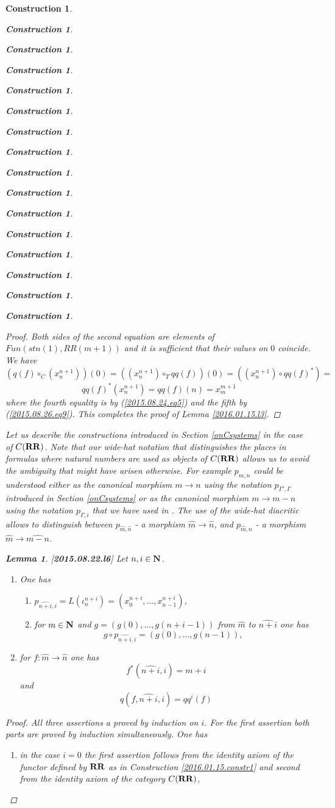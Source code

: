 \documentclass[12pt]{amsart}
\newtheorem{lemma}[proposition]{Lemma}
\newtheorem{construction}[proposition]{Construction}
\newcommand{\llabel}[1]{\label{#1}[{\bf #1}]}
\newcommand{\sr}{\rightarrow}
\newcommand{\nn}{{\bf N\rm}}
\newcommand{\nat}{\nn}
\newcommand{\wh}{\widehat}
\newcommand{\mbind}[1]{{#1^*}}
\newcommand{\RR}{{\bf RR}}
\begin{document}
\begin{construction}
\begin{construction}
\begin{construction}
\begin{construction}
\begin{construction}
\begin{construction}
\begin{construction}
\begin{construction}
\begin{construction}
\begin{construction}
\begin{construction}
\begin{construction}
\begin{construction}
\begin{construction}
\begin{construction}
\begin{construction}
\begin{proof}
Both sides of the second equation are elements of $Fun(stn(1),RR(m+1))$ and it is sufficient that their values on $0$ coincide. We have 
%
$$(q(f)\circ_C (x_n^{n+1}))(0)=((x_n^{n+1})\circ_T qq(f))(0)=((x_n^{n+1})\circ \mbind{qq(f)})=$$$$\mbind{qq(f)}(x_n^{n+1})=qq(f)(n)=x_m^{m+1}$$
%
where the fourth equality is by (\ref{2015.08.24.eq5}) and the fifth by (\ref{2015.08.26.eq9}). This completes the proof of Lemma \ref{2016.01.15.l3}.
\end{proof}

%
Let us describe the constructions introduced in Section \ref{onCsystems} in the case of $C(\RR)$. Note that our wide-hat notation that distinguishes the places in formulas where natural numbers are used as objects of $C(\RR)$ allows us to avoid the ambiguity that might have arisen otherwise. For example $p_{m,n}$ could be understood either as the canonical morphism $m\sr n$ using the notation $p_{\Gamma',\Gamma}$ introduced in Section \ref{onCsystems} or as the canonical morphism $m\sr m-n$ using the notation $p_{\Gamma,i}$ that we have used in \cite{Csubsystems}.  The use of the wide-hat diacritic allows to distinguish between $p_{\wh{m},\wh{n}}$ - a morphism $\wh{m}\sr \wh{n}$,  and $p_{\wh{m},n}$ - a morphism $\wh{m}\sr \wh{m-n}$. 
%
\begin{lemma}
\llabel{2015.08.22.l6}
Let $n,i\in\nat$. 
%
\begin{enumerate}
\item One has
%
\begin{enumerate}
\item $p_{\wh{n+i},i}=L(\iota^{n+i}_{n})=(x_0^{n+i},\dots,x_{n-1}^{n+i})$,
\item for $m\in\nat$ and $g=(g(0),\dots,g(n+i-1))$ from $\wh{m}$ to $\wh{n+i}$ one has 
%
$$g\circ p_{\wh{n+i},i}=(g(0),\dots,g(n-1)),$$
%
\end{enumerate}
%
\item for $f:\wh{m}\sr \wh{n}$ one has
%
$$f^*(\wh{n+i},i)=m+i$$
%
and
%
$$q(f,\wh{n+i},i)=qq^i(f)$$
%
\end{enumerate}
\end{lemma}
%
\begin{proof}
All three assertions a proved by induction on $i$. For the first assertion both parts are proved by induction simultaneously. One has
%
\begin{enumerate}
\item in the case $i=0$ the first assertion follows from the identity axiom of the functor defined by $\RR$ as in Construction \ref{2016.01.15.constr1} and second from the identity axiom of the category $C(\RR)$,

\end{enumerate}
\end{proof}
\end{construction}
\end{construction}
\end{construction}
\end{construction}
\end{construction}
\end{construction}
\end{construction}
\end{construction}
\end{construction}
\end{construction}
\end{construction}
\end{construction}
\end{construction}
\end{construction}
\end{construction}
\end{construction}
\end{document}
